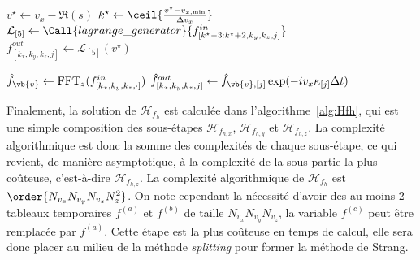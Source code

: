 \begin{itemize}
\begin{algorithm}
\begin{algorithmic}[1]
              \State $v^{\star} \gets v_x - \Re(s)$
              \State $k^{\star} \gets \ceil{\frac{ v^{\star}-v_{x,\text{min}} }{ \Delta v_x }}$
              \State $\mathcal{L}_{[5]} \gets \Call{lagrange\_generator}{f^{in}_{[k^\star-3:k^\star+2,k_y,k_z,j]}}$
              \State $f^{out}_{[k_x,k_y,k_z,j]} \gets \mathcal{L}_{[5]}( v^{\star} )$
            \EndFor
          \EndFor
        \EndFunction

          \vspace{0.25cm}

          \ForAll{$(k_x,k_y,k_z)\in[\![0,N_{v_x}[\![\times[\![0,N_{v_y}[\![\times[\![0,N_{v_z}[\![$}
            \State $\hat{f}_{\vb{v}} \gets \text{FFT}_z(f^{in}_{[k_x,k_y,k_z,\cdot]})$
              \State $\hat{f}^{out}_{[k_x,k_y,k_z,j]} \gets \hat{f}_{\vb{v},[j]}\exp(-iv_x\kappa_{[j]}\Delta t)$
            \EndFor
          \EndFor
        \EndFunction

          \vspace{0.25cm}

          \State {}
          \State {}
          \State {}
        \EndFunction
      \end{algorithmic}
    \end{algorithm}
\end{itemize}

Finalement, la solution de $\mathcal{H}_{f_h}$ est calculée dans l'algorithme~\ref{alg:Hfh}, qui est une simple composition des sous-étapes $\mathcal{H}_{f_{h,x}}$, $\mathcal{H}_{f_{h,y}}$ et $\mathcal{H}_{f_{h,z}}$. La complexité algorithmique est donc la somme des complexités de chaque sous-étape, ce qui revient, de manière asymptotique, à la complexité de la sous-partie la plus coûteuse, c'est-à-dire $\mathcal{H}_{f_{h,z}}$. La complexité algorithmique de $\mathcal{H}_{f_h}$ est $\order{N_{v_x}N_{v_y}N_{v_z}N_z^2}$. On note cependant la nécessité d'avoir des au moins 2 tableaux temporaires $f^{(a)}$ et $f^{(b)}$ de taille $N_{v_x}N_{v_y}N_{v_z}$, la variable $f^{(c)}$ peut être remplacée par $f^{(a)}$. Cette étape est la plus coûteuse en temps de calcul, elle sera donc placer au milieu de la méthode \emph{splitting} pour former la méthode de Strang.

